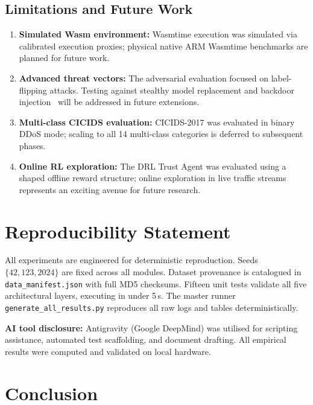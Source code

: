 \documentclass[sn-mathphys,Numbered]{sn-jnl}
\begin{document}
\subsection{Limitations and Future Work}
\begin{enumerate}
  \item \textbf{Simulated Wasm environment:} Wasmtime execution was simulated via calibrated execution proxies; physical native ARM Wasmtime benchmarks are planned for future work.
  \item \textbf{Advanced threat vectors:} The adversarial evaluation focused on label-flipping attacks. Testing against stealthy model replacement and backdoor injection~\cite{bagdasaryan2020} will be addressed in future extensions.
  \item \textbf{Multi-class CICIDS evaluation:} CICIDS-2017 was evaluated in binary DDoS mode; scaling to all 14 multi-class categories is deferred to subsequent phases.
  \item \textbf{Online RL exploration:} The DRL Trust Agent was evaluated using a shaped offline reward structure; online exploration in live traffic streams represents an exciting avenue for future research.
\end{enumerate}

\section{Reproducibility Statement}\label{sec:repro}

All experiments are engineered for deterministic reproduction. Seeds $\{42, 123, 2024\}$ are fixed across all modules. Dataset provenance is catalogued in \texttt{data\_manifest.json} with full MD5 checksums. Fifteen unit tests validate all five architectural layers, executing in under 5\,s. The master runner \texttt{generate\_all\_results.py} reproduces all raw logs and tables deterministically.

\textbf{AI tool disclosure:} Antigravity (Google DeepMind) was utilised for scripting assistance, automated test scaffolding, and document drafting. All empirical results were computed and validated on local hardware.

\section{Conclusion}\label{sec:conclusion}
\end{document}
